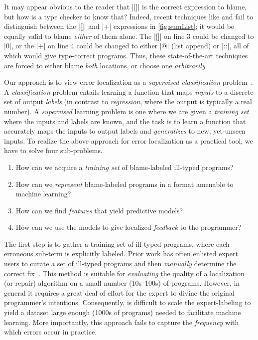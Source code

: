 It may appear obvious to the reader that
|[]| is the correct expression to blame,
but how is a type checker to know that?
%
Indeed, %
recent techniques like
\sherrloc and \mycroft
\citep{Zhang2014-lv,Loncaric2016-uk,Pavlinovic2014-mr}
fail to distinguish between
the |[]| and |+| expressions
in \autoref{fig:sumList};
it would be equally valid
to blame \emph{either}
of them alone.
%
The |[]| on line 3 could be changed to |0|,
or the |+| on line 4 could be changed to
either |@| (list append) or |::|, all of
which would give type-correct programs.
%
Thus, these state-of-the-art techniques
are forced to either blame \emph{both}
locations, or choose one \emph{arbitrarily}.

%
Our approach is to view error localization as a
\emph{supervised classification}
problem~\citep{Kotsiantis2007-pj}.
%
A \emph{classification} problem entails learning
a function that maps \emph{inputs} to a discrete
set of output \emph{labels} (in contrast to %
\emph{regression}, where the output is typically
a real number).
%
A \emph{supervised} learning problem is one where
we are given a \emph{training set} where the
inputs and labels are known, and the task is to
learn a function that accurately maps the inputs
to output labels and \emph{generalizes} to new,
yet-unseen inputs.
%
To realize the above approach for error localization
as a practical tool, we have to solve four sub-problems.
%
\begin{enumerate}
  \item How can we acquire a \emph{training set} of
        blame-labeled ill-typed programs?

  \item How can we \emph{represent} blame-labeled programs
        in a format amenable to machine learning?

  \item How can we find \emph{features} that yield predictive
        models?

  \item How can we use the models to give localized
        \emph{feedback} to the programmer?
\end{enumerate}


The first step is to gather a training
set of ill-typed programs, where each
erroneous sub-term is explicitly labeled.
%
Prior work has often enlisted
expert users to curate a set of
ill-typed programs and then
\emph{manually} determine the
correct fix~\citep[\eg][]{Lerner2007-dt,Loncaric2016-uk}.
%
This method is suitable for
\emph{evaluating} the quality
of a localization (or repair)
algorithm on a small number
(\eg 10s--100s) of programs.
%
However, in general it requires
a great deal of effort for the
expert to divine the original
programmer's intentions.
%
Consequently, is difficult to
scale the expert-labeling to
yield a dataset large enough
(\eg 1000s of programs) needed
to facilitate machine learning.
%
More importantly, this approach
fails to capture the \emph{frequency}
with which errors occur in practice.

